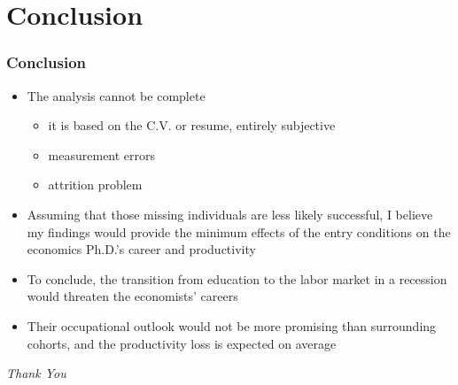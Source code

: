 \documentclass[10pt,svgnames,fragile]{beamer}
\begin{document}
{
	\AtBeginSection{}

\section{Conclusion}
\begin{frame}
	\frametitle{Conclusion}
	\begin{itemize}
		\item The analysis cannot be complete
		\begin{itemize}
			\item it is based on the C.V. or resume, entirely subjective
			\vspace{1 mm}
			\item measurement errors
			\vspace{1 mm}
			\item attrition problem
		\end{itemize}
	\vfill
		\item Assuming that those missing individuals are less likely successful, I believe my findings would provide 	the minimum effects of the entry conditions on the economics Ph.D.'s career and productivity
		\vfill
		\item To conclude, the transition from education to the labor market in a recession would threaten the economists' careers
		\vfill
		\item Their occupational outlook would not be more 		promising than surrounding cohorts, and the productivity loss is expected on average
\vfill	
\end{itemize}
\end{frame}
}

\begin{frame}{}
	\centering \Huge
	\emph{Thank You}
\end{frame}

\end{document}
